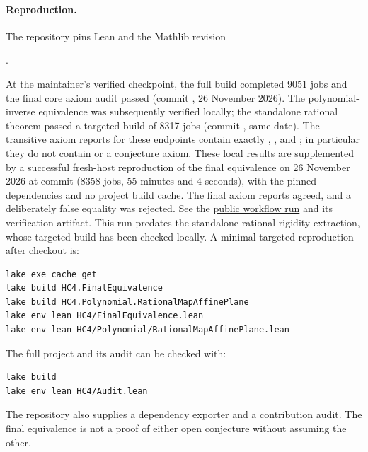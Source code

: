 \documentclass[11pt,a4paper]{article}
\begin{document}
\paragraph{Reproduction.}
The repository pins Lean  and the Mathlib revision\par
\noindent{}.\par
At the maintainer's verified checkpoint, the full build completed 9051 jobs and the final core axiom audit passed (commit , 26 November 2026). The polynomial-inverse equivalence was subsequently verified locally; the standalone rational theorem passed a targeted build of 8317 jobs (commit , same date). The transitive axiom reports for these endpoints contain exactly , , and ; in particular they do not contain  or a conjecture axiom. These local results are supplemented by a successful fresh-host reproduction of the final equivalence on 26 November 2026 at commit  (8358 jobs, 55 minutes and 4 seconds), with the pinned dependencies and no project build cache. The final axiom reports agreed, and a deliberately false equality was rejected. See the \href{https://github.com/JamieLittle16/HessianConjecture4/actions/runs/45855370863}{public workflow run} and its verification artifact. This run predates the standalone rational rigidity extraction, whose targeted build has been checked locally. A minimal targeted reproduction after checkout is:
\begin{verbatim}
lake exe cache get
lake build HC4.FinalEquivalence
lake build HC4.Polynomial.RationalMapAffinePlane
lake env lean HC4/FinalEquivalence.lean
lake env lean HC4/Polynomial/RationalMapAffinePlane.lean
\end{verbatim}
The full project and its audit can be checked with:
\begin{verbatim}
lake build
lake env lean HC4/Audit.lean
\end{verbatim}
The repository also supplies a dependency exporter and a contribution audit. The final equivalence is not a proof of either open conjecture without assuming the other.
\end{document}
